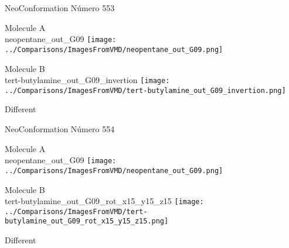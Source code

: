  \newpage

\vtab[-3cm]
\begin{center}
{\large NeoConformation \tab Número 553}
\end{center}
\begin{multicols}{2}
\begin{center}
Molecule A \\ 
neopentane\_out\_G09
\texttt{[image: ../Comparisons/ImagesFromVMD/neopentane\_out\_G09.png]}
\\
\vtab

\columnbreak
Molecule B \\ 
tert-butylamine\_out\_G09\_invertion
\texttt{[image: ../Comparisons/ImagesFromVMD/tert-butylamine\_out\_G09\_invertion.png]}
\\
\vtab


\end{center}
\end{multicols}
\begin{center}
\textcolor{NavyBlue}{\Large Different}
\end{center}

 \newpage

\vtab[-3cm]
\begin{center}
{\large NeoConformation \tab Número 554}
\end{center}
\begin{multicols}{2}
\begin{center}
Molecule A \\ 
neopentane\_out\_G09
\texttt{[image: ../Comparisons/ImagesFromVMD/neopentane\_out\_G09.png]}
\\
\vtab

\columnbreak
Molecule B \\ 
tert-butylamine\_out\_G09\_rot\_x15\_y15\_z15
\texttt{[image: ../Comparisons/ImagesFromVMD/tert-butylamine\_out\_G09\_rot\_x15\_y15\_z15.png]}
\\
\vtab


\end{center}
\end{multicols}
\begin{center}
\textcolor{NavyBlue}{\Large Different}
\end{center}

 \newpage

